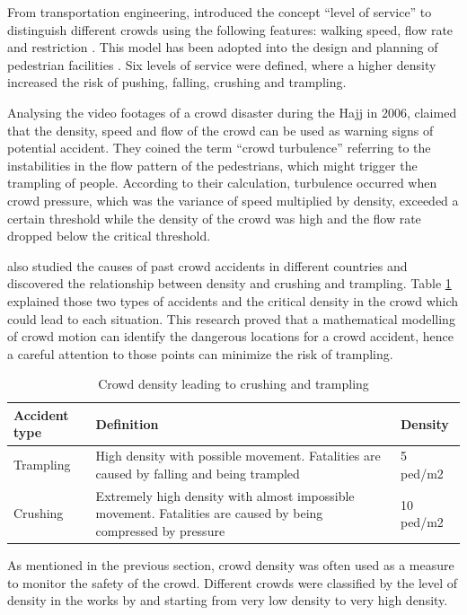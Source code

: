 From transportation engineering, \textcite{Fruin1970} introduced the concept ``level of service'' to distinguish different crowds using the following features: walking speed, flow rate and restriction \parencite{Challenger2009}. This model has been adopted into the design and planning of pedestrian facilities \parencite{Shiwakoti2008,Ye2008}. Six levels of service were defined, where a higher density increased the risk of pushing, falling, crushing and trampling.

Analysing the video footages of a crowd disaster during the Hajj in 2006, \textcite{Helbing2007} claimed that the density, speed and flow of the crowd can be used as warning signs of potential accident. They coined the term ``crowd turbulence'' referring to the instabilities in the flow pattern of the pedestrians, which might trigger the trampling of people. According to their calculation, turbulence occurred when crowd pressure, which was the variance of speed multiplied by density, exceeded a certain threshold while the density of the crowd was high and the flow rate dropped below the critical threshold.

\textcite{Lee2005} also studied the causes of past crowd accidents in different countries and discovered the relationship between density and crushing and trampling. Table \ref{table:densityCrushingTrampling} explained those two types of accidents and the critical density in the crowd which could lead to each situation. This research proved that a mathematical modelling of crowd motion can identify the dangerous locations for a crowd accident, hence a careful attention to those points can minimize the risk of trampling.

\begin{table}
	\caption{Crowd density leading to crushing and trampling}
	\label{table:densityCrushingTrampling}
	\centering
	\begin{tabular}{|l|p{9.5cm}|l|}
		\hline
		\textbf{Accident type} & \textbf{Definition} & \textbf{Density} \\ \hline \hline
		Trampling & High density with possible movement. Fatalities are caused by falling and being trampled & 5 ped/m2 \\ \hline
		Crushing & Extremely high density with almost impossible movement. Fatalities are caused by being compressed by pressure & 10 ped/m2 \\ \hline
	\end{tabular}
\end{table}

As mentioned in the previous section, crowd density was often used as a measure to monitor the safety of the crowd. Different crowds were classified by the level of density in the works by \textcite{Marana1997} and \textcite{Weppner2013} starting from very low density to very high density.

